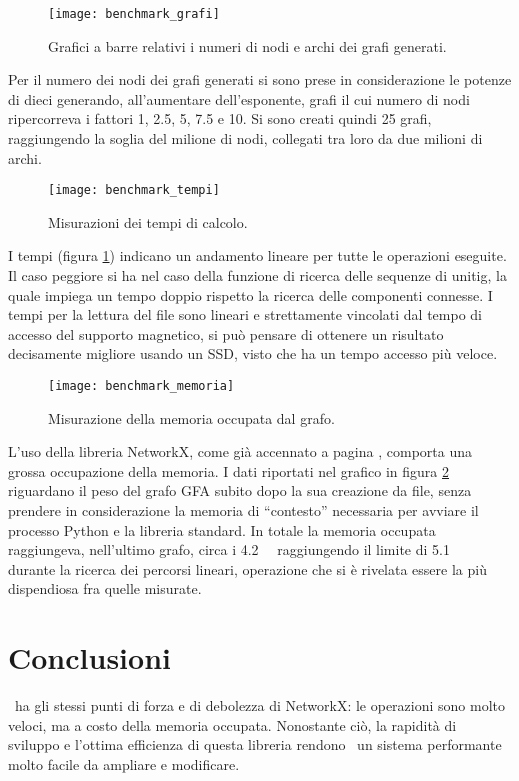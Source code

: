 \captionsetup{justification=centering, singlelinecheck=false}
\begin{figure}[h]
\centering
\texttt{[image: benchmark\_grafi]}
\caption[Grafico a barre dei grafi generati]{Grafici a barre relativi i numeri di nodi e archi dei grafi generati.}
\end{figure}
\captionsetup{justification=justified, singlelinecheck=false}
Per il numero dei nodi dei grafi generati si sono prese in considerazione
le potenze di dieci generando, all'aumentare dell'esponente, grafi il cui
numero di nodi ripercorreva i fattori 1, 2.5, 5, 7.5 e 10.
Si sono creati quindi 25 grafi, raggiungendo la soglia
del milione di nodi, collegati tra loro da due milioni di archi.


\captionsetup{justification=centering, singlelinecheck=false}
\begin{figure}
\centering
\texttt{[image: benchmark\_tempi]}
\caption[Grafici dei tempi di calcolo delle operazioni su grafo]{Misurazioni dei tempi di calcolo.}
\label{fig:bench-timings}
\end{figure}
\captionsetup{justification=justified, singlelinecheck=false}
I tempi (figura \ref{fig:bench-timings}) indicano un andamento lineare
per tutte le operazioni eseguite. Il caso peggiore si ha nel caso
della funzione di ricerca delle sequenze di unitig, la quale
impiega un tempo doppio rispetto la ricerca delle componenti connesse.
I tempi per la lettura del file sono lineari e strettamente vincolati
dal tempo di accesso del supporto magnetico, si può pensare di ottenere
un risultato decisamente migliore usando un SSD, visto che
ha un tempo accesso più veloce.

\clearpage
\captionsetup{justification=centering, singlelinecheck=false}
\begin{figure}[h]
\centering
\texttt{[image: benchmark\_memoria]}
\caption[Grafici della memoria occupata dal grafo]{Misurazione della memoria occupata dal grafo.}
\label{fig:graph-memory}
\end{figure}
\captionsetup{justification=justified, singlelinecheck=false}
L'uso della libreria NetworkX, come già accennato a pagina \pageref{sec:nx-why-limits},
comporta una grossa occupazione della memoria. I dati riportati nel grafico
in figura \ref{fig:graph-memory}
riguardano il peso del grafo GFA subito dopo la sua creazione da file, senza
prendere in considerazione la memoria di ``contesto'' necessaria per avviare
il processo Python e la libreria standard. In totale la memoria occupata
raggiungeva, nell'ultimo grafo, circa i \SI{4.2}{\giga\byte} raggiungendo
il limite di \SI{5.1}{\giga\byte} durante la ricerca dei percorsi lineari, operazione
che si è rivelata essere la più dispendiosa fra quelle misurate.

\section{Conclusioni}
\pygfa \  ha gli stessi punti di forza e di debolezza di NetworkX:
le operazioni sono molto veloci, ma a costo della memoria occupata.
Nonostante ciò, la rapidità di sviluppo e l'ottima efficienza di questa libreria
rendono \pygfa \  un sistema performante molto facile da ampliare e modificare.
